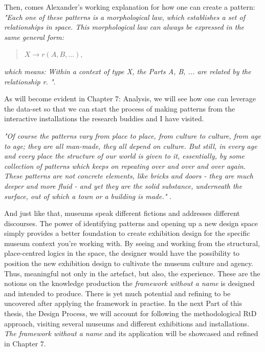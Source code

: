 Then, comes Alexander's working explanation for how one can create a pattern: \emph{"Each one of these patterns is a morphological law, which establishes a set of relationships in space. This morphological law can always be expressed in the same general form:}

\begin{quote}
\centering $X \rightarrow r (A, B, ...)$,
\end{quote}

\emph{
which means: Within a context of type X, the Parts A, B, ... are related by the relationship r. "}\autocite[p. 90]{Alexander_book}.

As will become evident in Chapter 7: Analysis, we will see how one can leverage the data-set so that we can start the process of making patterns from the interactive installations the research buddies and I have visited.

\emph{"Of course the patterns vary from place to place, from culture to culture, from age to age; they are all man-made, they all depend on culture. But still, in every age and every place the structure of our world is given to it, essentially, by some collection of patterns which keeps on repeating over and over and over again. These patterns are not concrete elements, like bricks and doors - they are much deeper and more fluid - and yet they are the solid substance, underneath the surface, out of which a town or a building is made."} \autocite[p. 100]{Alexander_book}.

And just like that, museums speak different fictions and addresses different discourses. The power of identifying patterns and opening up a new design space simply provides a better foundation to create exhibition design for the specific museum context you're working with. By seeing and working from the structural, place-centred logics in the space, the designer would have the possibility to position the new exhibition design to cultivate the museum culture and agency. Thus, meaningful not only in the artefact, but also, the experience. These are the notions on the knowledge production the \emph{framework without a name} is designed and intended to produce. There is yet much potential and refining to be uncovered after applying the framework in practise. In the next Part of this thesis, the Design Process, we will account for following the methodological RtD approach, visiting several museums and different exhibitions and installations. \emph{The framework without a name} and its application will be showcased and refined in Chapter 7. 